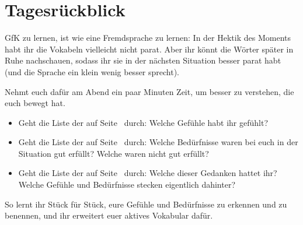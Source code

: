 \section{Tagesrückblick}
\label{tagesrueckblick}

GfK zu lernen, ist wie eine Fremdsprache zu lernen: In der Hektik des Moments habt ihr die Vokabeln vielleicht nicht parat. Aber ihr könnt die Wörter später in Ruhe nachschauen, sodass ihr sie in der nächsten Situation besser parat habt (und die Sprache ein klein wenig besser sprecht).

Nehmt euch dafür am Abend ein paar Minuten Zeit, um  besser zu verstehen, die euch bewegt hat.

\begin{itemize}
    \item Geht die Liste der  auf Seite~\pageref{gefuehle-liste} durch: Welche Gefühle habt ihr gefühlt?
    \item Geht die Liste der  auf Seite~\pageref{beduerfnisse-liste} durch: Welche Bedürfnisse waren bei euch in der Situation gut erfüllt? Welche waren nicht gut erfüllt?
    \item Geht die Liste der  auf Seite~\pageref{pseudogefuehle} durch: Welche dieser Gedanken hattet ihr? Welche Gefühle und Bedürfnisse stecken eigentlich dahinter?
\end{itemize}

So lernt ihr Stück für Stück, eure Gefühle und Bedürfnisse zu erkennen und zu benennen, und ihr erweitert euer aktives Vokabular dafür.
